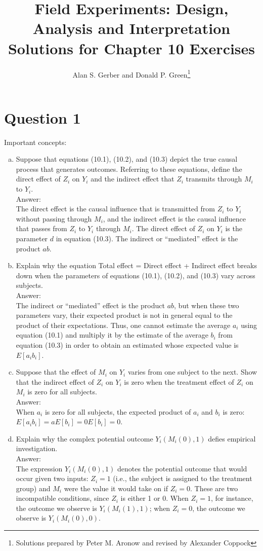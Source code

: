 \documentclass[11pt,notitlepage]{article}\usepackage[]{graphicx}\usepackage[]{color}
\title{Field Experiments: Design, Analysis and Interpretation \\
Solutions for Chapter 10 Exercises}
\author{Alan S. Gerber and Donald P. Green\footnote{Solutions prepared by Peter M. Aronow and revised by Alexander Coppock}}
\date{\vspace{-5ex}}
\begin{document}
\maketitle


\section*{Question 1}
Important concepts:

\begin{enumerate}[a)]
\item Suppose that equations (10.1), (10.2), and (10.3) depict the true causal process that generates outcomes. Referring to these equations, define the direct effect of $Z_i$ on $Y_i$ and the indirect effect that $Z_i$ transmits through $M_i$ to $Y_i$.\\
Answer:\\
The direct effect is the causal influence that is transmitted from $Z_i$ to $Y_i$ without passing through $M_i$, and the indirect effect is the causal influence that passes from $Z_i$ to $Y_i$ through $M_i$. The direct effect of $Z_i$ on $Y_i$ is the parameter $d$ in equation (10.3).  The indirect or ``mediated'' effect is the product $ab$.


\item Explain why the equation Total effect = Direct effect + Indirect effect breaks down when the parameters of equations (10.1), (10.2), and (10.3) vary across subjects.\\
Answer:\\
The indirect or ``mediated'' effect is the product $ab$, but when these two parameters vary, their expected product is not in general equal to the product of their expectations.  Thus, one cannot estimate the average $a_i$ using equation (10.1) and multiply it by the estimate of the average $b_i$ from equation (10.3) in order to obtain an estimated whose expected value is $E[a_i b_i]$.  

\item Suppose that the effect of $M_i$ on $Y_i$ varies from one subject to the next. Show that the indirect effect of $Z_i$ on $Y_i$ is zero when the treatment effect of $Z_i$ on $M_i$ is zero for all subjects.\\
Answer:\\
When $a_i$ is zero for all subjects, the expected product of $a_i$ and $b_i$ is zero:  $E[a_i b_i]=aE[b_i]= 0E[b_i]=0$.   

\item Explain why the complex potential outcome $Y_i(M_i(0),1)$ defies empirical investigation.\\
Answer:\\
The expression $Y_i (M_i (0),1)$ denotes the potential outcome that would occur given two inputs: $Z_i=1$ (i.e., the subject is assigned to the treatment group) and $M_i$ were the value it would take on if $Z_i=0$. These are two incompatible conditions, since $Z_i$ is either 1 or 0. When $Z_i=1$, for instance, the outcome we observe is $Y_i (M_i (1),1)$; when $Z_i=0$, the outcome we observe is $Y_i (M_i (0),0)$.


\end{enumerate}
\end{document}
